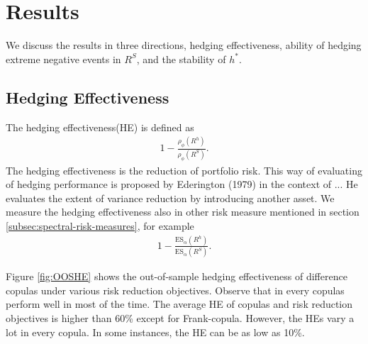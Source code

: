 \section{Results}
We discuss the results in three directions, hedging effectiveness,
ability of hedging extreme negative events in $R^S$, and the stability of $h^*$.

\subsection{Hedging Effectiveness}
The hedging effectiveness(HE) is defined as
\begin{align}
  1- \frac{\rho_\phi(R^h)}{\rho_\phi(R^S)}.
  \end{align}
The hedging effectiveness is the reduction of portfolio risk.
This way of evaluating of hedging performance is proposed by Ederington (1979) in the context of ...
He evaluates the extent of variance reduction by introducing another asset.
We measure the hedging effectiveness also in other risk measure mentioned in section \ref{subsec:spectral-risk-measures},
for example
\begin{align}
  1- \frac{\text{ES}_\alpha(R^h)}{\text{ES}_\alpha(R^S)}.
  \end{align}

Figure \ref{fig:OOSHE} shows the out-of-sample hedging effectiveness of difference copulas under various risk
reduction objectives.
Observe that in every copulas perform well in most of the time.
The average HE of copulas and risk reduction objectives is higher than 60\% except for Frank-copula.
However, the HEs vary a lot in every copula.
In some instances, the HE can be as low as 10\%.



